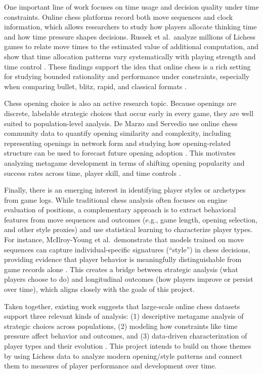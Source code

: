 \documentclass[
  12pt]{article}
\begin{document}
One important line of work focuses on time usage and decision quality
under time constraints. Online chess platforms record both move
sequences and clock information, which allows researchers to study how
players allocate thinking time and how time pressure shapes decisions.
Russek et al.~analyze millions of Lichess games to relate move times to
the estimated value of additional computation, and show that time
allocation patterns vary systematically with playing strength and time
control \citep{russek2025thinking}. These findings support the idea that
online chess is a rich setting for studying bounded rationality and
performance under constraints, especially when comparing bullet, blitz,
rapid, and classical formats \citep{russek2025thinking}.

Chess opening choice is also an active research topic. Because openings
are discrete, labelable strategic choices that occur early in every
game, they are well suited to population-level analysis. De Marzo and
Servedio use online chess community data to quantify opening similarity
and complexity, including representing openings in network form and
studying how opening-related structure can be used to forecast future
opening adoption \citep{demarzo2023openings}. This motivates analyzing
metagame development in terms of shifting opening popularity and success
rates across time, player skill, and time controls
\citep{demarzo2023openings, chowdhary2023performance}.

Finally, there is an emerging interest in identifying player styles or
archetypes from game logs. While traditional chess analysis often
focuses on engine evaluation of positions, a complementary approach is
to extract behavioral features from move sequences and outcomes (e.g.,
game length, opening selection, and other style proxies) and use
statistical learning to characterize player types. For instance,
McIlroy-Young et al.~demonstrate that models trained on move sequences
can capture individual-specific signatures (``style'') in chess
decisions, providing evidence that player behavior is meaningfully
distinguishable from game records alone
\citep{mcilroyyoung2021stylometry}. This creates a bridge between
strategic analysis (what players choose to do) and longitudinal outcomes
(how players improve or persist over time), which aligns closely with
the goals of this project.

Taken together, existing work suggests that large-scale online chess
datasets support three relevant kinds of analysis: (1) descriptive
metagame analysis of strategic choices across populations, (2) modeling
how constraints like time pressure affect behavior and outcomes, and (3)
data-driven characterization of player types and their evolution
\citep{chowdhary2023performance, russek2025thinking, demarzo2023openings, mcilroyyoung2021stylometry}.
This project intends to build on those themes by using Lichess data to
analyze modern opening/style patterns and connect them to measures of
player performance and development over time.
\end{document}
